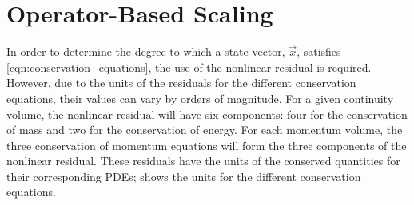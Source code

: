 \section{Operator-Based Scaling}
\label{sect:nln_solver:os}
In order to determine the degree to which a state vector, $\vec{x}$, satisfies \eqref{eqn:conservation_equations}, the use of the nonlinear residual is required.
However, due to the units of the residuals for the different conservation equations, their values can vary by orders of magnitude. 
For a given continuity volume, the nonlinear residual will have six components: four for the conservation of mass and two for the conservation of energy.
For each momentum volume, the three conservation of momentum equations will form the three components of the nonlinear residual.
These residuals have the units of the conserved quantities for their corresponding PDEs;  shows the units for the different conservation equations.

